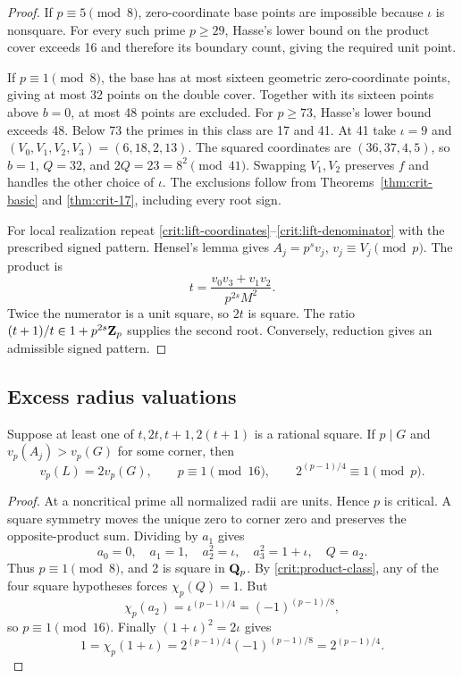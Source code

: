 \begin{proof}
If \(p\equiv5\pmod8\), zero-coordinate base points are impossible
because \(\iota\) is nonsquare. For every such prime \(p\ge29\),
Hasse's lower bound on the product cover exceeds 16 and therefore its
boundary count, giving the required unit point.

If \(p\equiv1\pmod8\), the base has at most sixteen geometric
zero-coordinate points, giving at most 32 points on the double cover.
Together with its sixteen points above \(b=0\), at most 48 points
are excluded. For \(p\ge73\), Hasse's lower bound exceeds 48.
Below 73 the primes in this class are 17 and 41. At 41 take
\(\iota=9\) and \((V_0,V_1,V_2,V_3)=(6,18,2,13)\).
The squared coordinates are \((36,37,4,5)\), so \(b=1\),
\(Q=32\), and \(2Q=23=8^2\pmod{41}\).
Swapping \(V_1,V_2\) preserves \(f\) and handles the other
choice of \(\iota\). The exclusions follow from
Theorems~\ref{thm:crit-basic} and
\ref{thm:crit-17}, including every root sign.

For local realization repeat
\eqref{crit:lift-coordinates}--\eqref{crit:lift-denominator} with
the prescribed signed pattern. Hensel's lemma gives
\(A_j=p^sv_j\), \(v_j\equiv V_j\pmod p\). The product is
\[
 t=\frac{v_0v_3+v_1v_2}{p^{2s}M^2}.
\]
Twice the numerator is a unit square, so \(2t\) is square.
The ratio \((t+1)/t\in1+p^{2s}\mathbf Z_p\) supplies the second
root. Conversely, reduction gives an admissible signed pattern.
\end{proof}

\subsection{Excess radius valuations}

\begin{corollary}\label{cor:crit-excess}
Suppose at least one of \(t,2t,t+1,2(t+1)\) is a
rational square. If \(p\mid G\) and \(v_p(A_j)>v_p(G)\) for
some corner, then
\[
 v_p(L)=2v_p(G),\qquad p\equiv1\pmod{16},\qquad
 2^{(p-1)/4}\equiv1\pmod p.
\]
\end{corollary}

\begin{proof}
At a noncritical prime all normalized radii are units. Hence \(p\)
is critical. A square symmetry moves the unique zero to corner zero
and preserves the opposite-product sum. Dividing by \(a_1\) gives
\[
 a_0=0,\quad a_1=1,\quad a_2^2=\iota,\quad
 a_3^2=1+\iota,\quad Q=a_2.
\]
Thus \(p\equiv1\pmod8\), and 2 is square in \(\mathbf Q_p\).
By \eqref{crit:product-class}, any of the four square hypotheses
forces \(\chi_p(Q)=1\). But
\[
 \chi_p(a_2)=\iota^{(p-1)/4}=(-1)^{(p-1)/8},
\]
so \(p\equiv1\pmod{16}\). Finally \((1+\iota)^2=2\iota\) gives
\[
 1=\chi_p(1+\iota)
 =2^{(p-1)/4}(-1)^{(p-1)/8}=2^{(p-1)/4}.
\]
\end{proof}
